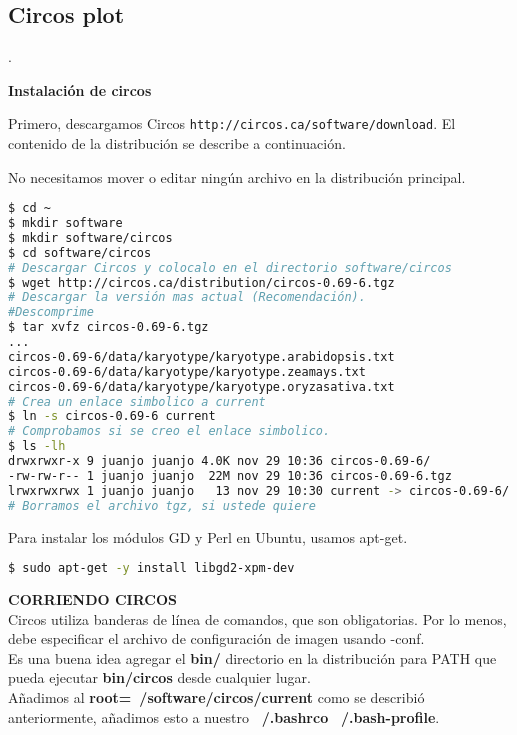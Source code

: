 \documentclass[12pt,letterpaper]{article}
\begin{document}
\subsection{Circos plot}.

\textbf{Instalación de circos}

Primero, descargamos Circos \texttt{http://circos.ca/software/download}. El contenido de la distribución se describe a continuación.

No necesitamos mover o editar ningún archivo en la distribución principal.


\begin{lstlisting}[language=bash,caption={Suponiendo que desea instalar en ROOT=~/software/circos},style=consola]
$ cd ~
$ mkdir software
$ mkdir software/circos
$ cd software/circos
# Descargar Circos y colocalo en el directorio software/circos
$ wget http://circos.ca/distribution/circos-0.69-6.tgz
# Descargar la versión mas actual (Recomendación).
#Descomprime 
$ tar xvfz circos-0.69-6.tgz
...
circos-0.69-6/data/karyotype/karyotype.arabidopsis.txt
circos-0.69-6/data/karyotype/karyotype.zeamays.txt
circos-0.69-6/data/karyotype/karyotype.oryzasativa.txt
# Crea un enlace simbolico a current 
$ ln -s circos-0.69-6 current
# Comprobamos si se creo el enlace simbolico.
$ ls -lh
drwxrwxr-x 9 juanjo juanjo 4.0K nov 29 10:36 circos-0.69-6/
-rw-rw-r-- 1 juanjo juanjo  22M nov 29 10:36 circos-0.69-6.tgz
lrwxrwxrwx 1 juanjo juanjo   13 nov 29 10:30 current -> circos-0.69-6/
# Borramos el archivo tgz, si ustede quiere
\end{lstlisting}
Para instalar los módulos GD y Perl en Ubuntu, usamos apt-get.\\
\begin{lstlisting}[language=bash, style=consola]
$ sudo apt-get -y install libgd2-xpm-dev
\end{lstlisting}

\textbf{CORRIENDO CIRCOS}\\ 

Circos utiliza banderas de línea de comandos, que son obligatorias. Por lo menos, debe especificar el archivo de configuración de imagen usando -conf.\\

Es una buena idea agregar el \textbf{bin/} directorio en la distribución para PATH que pueda ejecutar \textbf{bin/circos} desde cualquier lugar.\\

Añadimos al \textbf{root=~/software/circos/current} como se describió anteriormente, añadimos esto a nuestro \textbf{~/.bashrco} \textbf{~/.bash-profile}.\\ 
\end{document}
